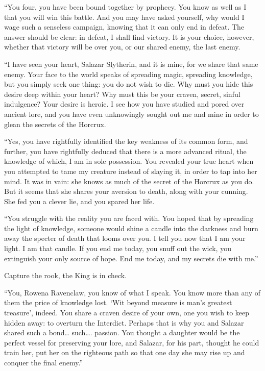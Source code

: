 “You four, you have been bound together by prophecy. You know as well as I that you will win this battle. And you may have asked yourself, why would I wage such a senseless campaign, knowing that it can only end in defeat. The answer should be clear: in defeat, I shall find victory. It is your choice, however, whether that victory will be over you, or our shared enemy, the last enemy.

“I have seen your heart, Salazar Slytherin, and it is mine, for we share that same enemy. Your face to the world speaks of spreading magic, spreading knowledge, but you simply seek one thing: you do not wish to die. Why must you hide this desire deep within your heart? Why must this be your craven, secret, sinful indulgence? Your desire is heroic. I see how you have studied and pored over ancient lore, and you have even unknowingly sought out me and mine in order to glean the secrets of the Horcrux.

“Yes, you have rightfully identified the key weakness of its common form, and further, you have rightfully deduced that there is a more advanced ritual, the knowledge of which, I am in sole possession. You revealed your true heart when you attempted to tame my creature instead of slaying it, in order to tap into her mind. It was in vain: she knows as much of the secret of the Horcrux as you do. But it seems that she shares your aversion to death, along with your cunning. She fed you a clever lie, and you spared her life.

“You struggle with the reality you are faced with. You hoped that by spreading the light of knowledge, someone would shine a candle into the darkness and burn away the specter of death that looms over you. I tell you now that I am your light. I am that candle. If you end me today, you snuff out the wick, you extinguish your only source of hope. End me today, and my secrets die with me.”

Capture the rook, the King is in check.

“You, Rowena Ravenclaw, you know of what I speak. You know more than any of them the price of knowledge lost. ‘Wit beyond measure is man’s greatest treasure’, indeed. You share a craven desire of your own, one you wish to keep hidden away: to overturn the Interdict. Perhaps that is why you and Salazar shared such a bond… such…. passion. You thought a daughter would be the perfect vessel for preserving your lore, and Salazar, for his part, thought he could train her, put her on the righteous path so that one day she may rise up and conquer the final enemy.”

